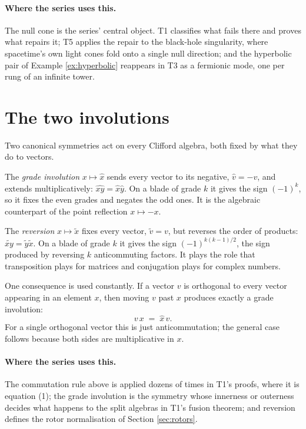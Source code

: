 \documentclass[11pt]{article}
\theoremstyle{plain}
\theoremstyle{definition}
\begin{document}
\paragraph{Where the series uses this.} The null cone is the series' central object. T1 classifies what fails there and proves what repairs it; T5 applies the repair to the black-hole singularity, where spacetime's own light cones fold onto a single null direction; and the hyperbolic pair of Example \ref{ex:hyperbolic} reappears in T3 as a fermionic mode, one per rung of an infinite tower.

\section{The two involutions}\label{sec:involutions}

Two canonical symmetries act on every Clifford algebra, both fixed by what they do to vectors.

The \emph{grade involution} $x \mapsto \hat{x}$ sends every vector to its negative, $\hat{v} = -v$, and extends multiplicatively: $\widehat{xy} = \hat{x}\hat{y}$. On a blade of grade $k$ it gives the sign $(-1)^{k}$, so it fixes the even grades and negates the odd ones. It is the algebraic counterpart of the point reflection $x \mapsto -x$.

The \emph{reversion} $x \mapsto \tilde{x}$ fixes every vector, $\tilde{v} = v$, but reverses the order of products: $\widetilde{xy} = \tilde{y}\tilde{x}$. On a blade of grade $k$ it gives the sign $(-1)^{k(k-1)/2}$, the sign produced by reversing $k$ anticommuting factors. It plays the role that transposition plays for matrices and conjugation plays for complex numbers.

One consequence is used constantly. If a vector $v$ is orthogonal to every vector appearing in an element $x$, then moving $v$ past $x$ produces exactly a grade involution:
\[
v\,x \;=\; \hat{x}\,v .
\]
For a single orthogonal vector this is just anticommutation; the general case follows because both sides are multiplicative in $x$.

\paragraph{Where the series uses this.} The commutation rule above is applied dozens of times in T1's proofs, where it is equation (1); the grade involution is the symmetry whose innerness or outerness decides what happens to the split algebras in T1's fusion theorem; and reversion defines the rotor normalisation of Section \ref{sec:rotors}.
\end{document}
